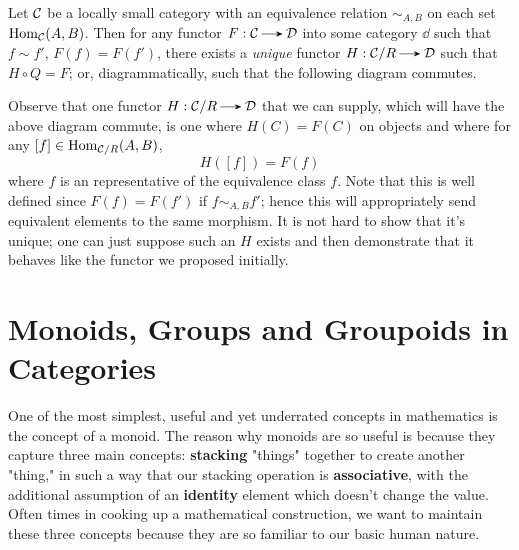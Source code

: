     \begin{proposition}
        Let $\mathcal{C}$ be a locally small category with an equivalence relation $\sim_{A, B}$ on each set 
        $\operatorname{\mathrm{Hom}}_{\mathcal{C}}(A, B)$. Then for any functor $F: \cc \to \dd$ into some category $\dd$ 
        such that $f \sim f'$, $F(f) = F(f')$, there exists a \emph{unique} functor 
        $H: \cc/R \to \dd$ such that $H \circ Q = F$;
        or, diagrammatically, such that the following diagram commutes.
        \begin{center}
        \end{center}
    \end{proposition}

    \begin{prf}
        Observe that one functor $H: \cc/R \to \dd$ that we can supply, 
        which will have the above diagram commute, is one where 
        $H(C) = F(C)$ on objects and where for any $[f] \in \operatorname{\mathrm{Hom}}_{\mathcal{C}/R}(A, B)$,
        \[
            H([f]) = F(f)   
        \]
        where $f$ is an representative of the equivalence class $f$. Note that 
        this is well defined since $F(f) = F(f')$ if $f \sim_{A,B} f'$; hence this 
        will appropriately send equivalent elements to the same morphism. It 
        is not hard to show that it's unique; one can just suppose such an $H$ exists and then 
        demonstrate that it behaves like the functor we proposed initially. 
    \end{prf}

    \begin{example}
        
    \end{example}


    
    

\newpage
\section{Monoids, Groups and Groupoids in Categories}

One of the most simplest, useful and yet underrated concepts in mathematics 
is the concept of a monoid. The reason why monoids are so useful is because 
they capture three main concepts: \textbf{stacking} "things" together to create another 
"thing," in such a way that our stacking operation is \textbf{associative}, 
with the additional assumption of an \textbf{identity} element which doesn't change the 
value. Often times in cooking up a mathematical construction, we want to maintain these 
three concepts because they are so familiar to our basic human nature. 

